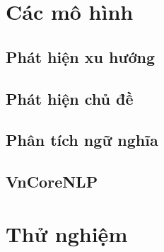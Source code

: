 \documentclass[11pt, a4paper]{article}
\begin{document}
\section{Các mô hình}
\label{sec:models}

\subsection{Phát hiện xu hướng}

\subsection{Phát hiện chủ đề}

\subsection{Phân tích ngữ nghĩa}

\subsection{VnCoreNLP}

\section{Thử nghiệm}
\label{sec:experiments}

\clearpage




\end{document}

